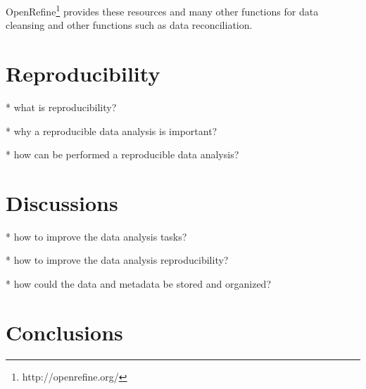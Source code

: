 \documentclass[12pt,a4paper]{amsart}
\numberwithin{equation}{section}
\theoremstyle{plain}
\theoremstyle{definition}
\begin{document}
OpenRefine\footnote{http://openrefine.org/} provides these resources and many other functions for data cleansing and other functions such as data reconciliation.

\section{Reproducibility}\label{reproducibility}

* what is reproducibility?

* why a reproducible data analysis is important?

* how can be performed a reproducible data analysis?




\section{Discussions}\label{discussions}

* how to improve the data analysis tasks?

* how to improve the data analysis reproducibility?

* how could the data and metadata be stored and organized?

\section{Conclusions}\label{conclusions}



{}

\end{document}

